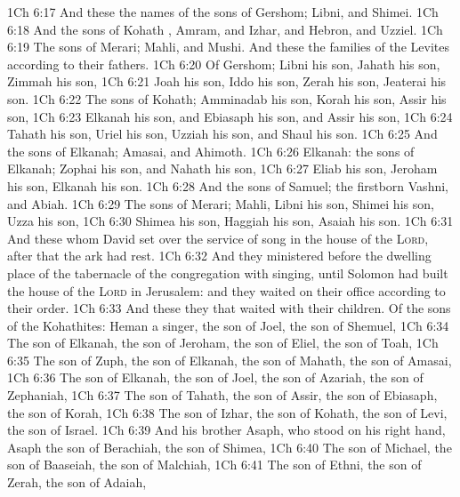 \vs 1Ch 6:17 And these  the names of the sons of Gershom; Libni, and Shimei.
\vs 1Ch 6:18 And the sons of Kohath , Amram, and Izhar, and Hebron, and Uzziel.
\vs 1Ch 6:19 The sons of Merari; Mahli, and Mushi. And these  the families of the Levites according to their fathers.
\vs 1Ch 6:20 Of Gershom; Libni his son, Jahath his son, Zimmah his son,
\vs 1Ch 6:21 Joah his son, Iddo his son, Zerah his son, Jeaterai his son.
\vs 1Ch 6:22 The sons of Kohath; Amminadab his son, Korah his son, Assir his son,
\vs 1Ch 6:23 Elkanah his son, and Ebiasaph his son, and Assir his son,
\vs 1Ch 6:24 Tahath his son, Uriel his son, Uzziah his son, and Shaul his son.
\vs 1Ch 6:25 And the sons of Elkanah; Amasai, and Ahimoth.
\vs 1Ch 6:26  Elkanah: the sons of Elkanah; Zophai his son, and Nahath his son,
\vs 1Ch 6:27 Eliab his son, Jeroham his son, Elkanah his son.
\vs 1Ch 6:28 And the sons of Samuel; the firstborn Vashni, and Abiah.
\vs 1Ch 6:29 The sons of Merari; Mahli, Libni his son, Shimei his son, Uzza his son,
\vs 1Ch 6:30 Shimea his son, Haggiah his son, Asaiah his son.
\vs 1Ch 6:31 And these  whom David set over the service of song in the house of the \textsc{Lord}, after that the ark had rest.
\vs 1Ch 6:32 And they ministered before the dwelling place of the tabernacle of the congregation with singing, until Solomon had built the house of the \textsc{Lord} in Jerusalem: and  they waited on their office according to their order.
\vs 1Ch 6:33 And these  they that waited with their children. Of the sons of the Kohathites: Heman a singer, the son of Joel, the son of Shemuel,
\vs 1Ch 6:34 The son of Elkanah, the son of Jeroham, the son of Eliel, the son of Toah,
\vs 1Ch 6:35 The son of Zuph, the son of Elkanah, the son of Mahath, the son of Amasai,
\vs 1Ch 6:36 The son of Elkanah, the son of Joel, the son of Azariah, the son of Zephaniah,
\vs 1Ch 6:37 The son of Tahath, the son of Assir, the son of Ebiasaph, the son of Korah,
\vs 1Ch 6:38 The son of Izhar, the son of Kohath, the son of Levi, the son of Israel.
\vs 1Ch 6:39 And his brother Asaph, who stood on his right hand,  Asaph the son of Berachiah, the son of Shimea,
\vs 1Ch 6:40 The son of Michael, the son of Baaseiah, the son of Malchiah,
\vs 1Ch 6:41 The son of Ethni, the son of Zerah, the son of Adaiah,
